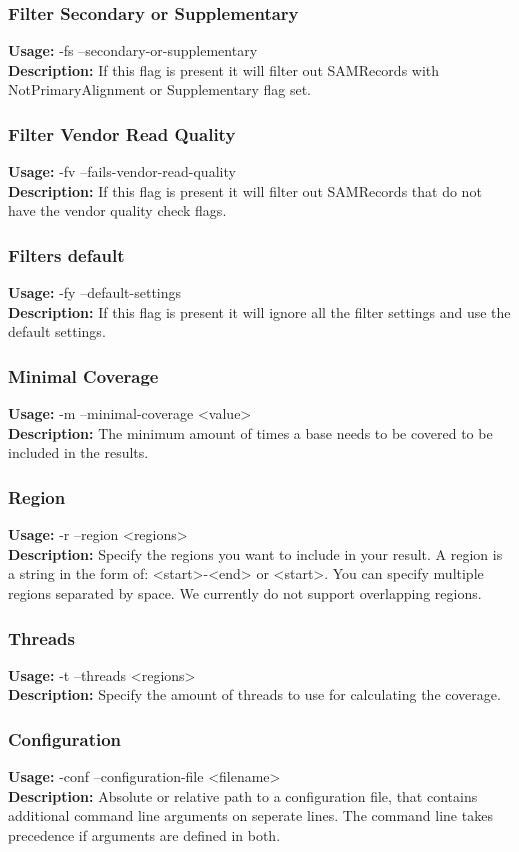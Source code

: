 \subsubsection{Filter Secondary or Supplementary}
\textbf{Usage:}  -fs --secondary-or-supplementary\\
\textbf{Description:} If this flag is present it will filter out SAMRecords with NotPrimaryAlignment or Supplementary flag set.

\subsubsection{Filter Vendor Read Quality}
\textbf{Usage:}  -fv --fails-vendor-read-quality \\
\textbf{Description:} If this flag is present it will filter out SAMRecords that do not have the vendor quality check flags.

\subsubsection{Filters default}
\textbf{Usage:} -fy --default-settings  \\
\textbf{Description:} If this flag is present it will ignore all the filter settings and use the default settings.

\subsubsection{Minimal Coverage}
\textbf{Usage:} -m --minimal-coverage <value>  \\
\textbf{Description:} The minimum amount of times a base needs to be covered to be included in the results.

\subsubsection{Region}
\textbf{Usage:} -r --region <regions>\\
\textbf{Description:} Specify the regions you want to include in your result. A region is a string in the form of: <start>-<end> or <start>. You can specify multiple regions separated by space. We currently do not support overlapping regions.

\subsubsection{Threads}
\textbf{Usage:} -t --threads <regions>\\
\textbf{Description:} Specify the amount of threads to use for calculating the coverage.

\subsubsection{Configuration}
\textbf{Usage:}  -conf --configuration-file <filename> \\
\textbf{Description:} Absolute or relative path to a configuration file, that contains additional command line arguments on seperate lines. The command line takes precedence if arguments are defined in both.
